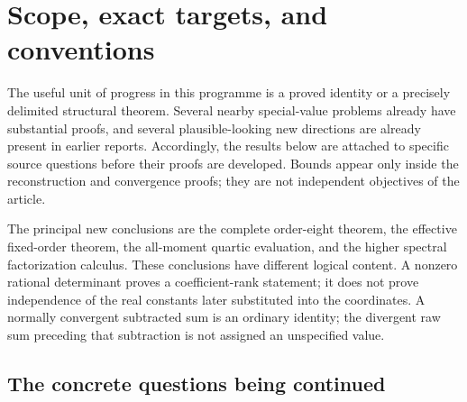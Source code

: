 \section{Scope, exact targets, and conventions}
\label{sec:scope}

The useful unit of progress in this programme is a proved identity or a
precisely delimited structural theorem.  Several nearby special-value
problems already have substantial proofs, and several plausible-looking
new directions are already present in earlier reports.  Accordingly,
the results below are attached to specific source questions before their
proofs are developed.  Bounds appear only inside the reconstruction and
convergence proofs; they are not independent objectives of the article.

The principal new conclusions are the complete order-eight theorem,
the effective fixed-order theorem, the all-moment quartic evaluation,
and the higher spectral factorization calculus.  These conclusions have
different logical content.  A nonzero rational determinant proves a
coefficient-rank statement; it does not prove independence of the real
constants later substituted into the coordinates.  A normally convergent
subtracted sum is an ordinary identity; the divergent raw sum preceding
that subtraction is not assigned an unspecified value.

\subsection{The concrete questions being continued}

